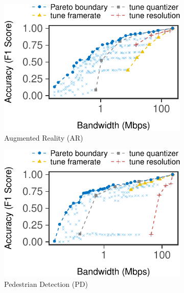 \begin{figure}[htb]
  \centering
  \begin{subfigure}[t]{0.32\textwidth}
    \centering
    \includegraphics[width=\textwidth]{figures/profile-darknet.pdf}
    \caption{Augmented Reality (AR)}
    \label{fig:ar-profile}
  \end{subfigure}
  \hfill
  \begin{subfigure}[t]{0.32\textwidth}
    \centering
    \includegraphics[width=\textwidth]{figures/profile-mot.pdf}
    \caption{Pedestrian Detection (PD)}
    \label{fig:pd-profile}
  \end{subfigure}
  \hfill
  \begin{subfigure}[t]{0.32\textwidth}
    \centering

\end{subfigure}
\end{figure}
